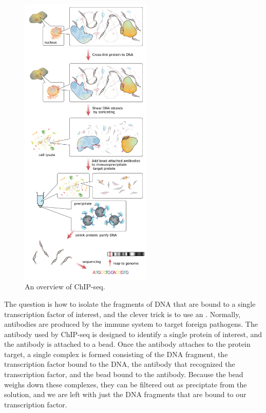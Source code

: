 \begin{figure}[hp]
\centering
\mySfFamily
\includegraphics[width = 0.56\textwidth]{../images/ChIP-seq_workflow.png}
\caption{An overview of ChIP-seq.}
\label{fig:ChIP-seq_workflow}
\end{figure}

The question is how to isolate the fragments of DNA that are bound to a single transcription factor of interest, and the clever trick is to use an . Normally, antibodies are produced by the immune system to target foreign pathogens. The antibody used by ChIP-seq is designed to identify a single protein of interest, and the antibody is attached to a bead. Once the antibody attaches to the protein target, a single complex is formed consisting of the DNA fragment, the transcription factor bound to the DNA, the antibody that recognized the transcription factor, and the bead bound to the antibody. Because the bead weighs down these complexes, they can be filtered out as preciptate from the solution, and we are left with just the DNA fragments that are bound to our transcription factor.

